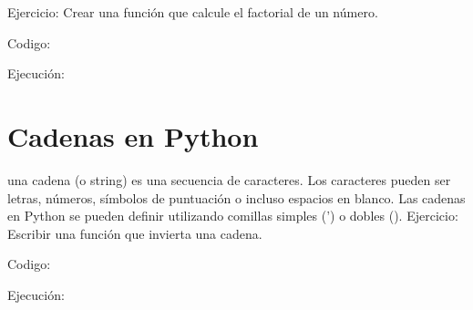 \documentclass[a4paper]{article}
\begin{document}
\bigskip

{
Ejercicio: Crear una función que calcule el factorial de un número.}



\begin{center}
\end{center}
{
Codigo:}

{
Ejecución:}

\begin{center}
\end{center}

\bigskip

\section{Cadenas en Python}

\bigskip

{
una cadena (o string) es una secuencia de caracteres. Los caracteres pueden ser letras, números, símbolos de puntuación
o incluso espacios en blanco. Las cadenas en Python se pueden definir utilizando comillas simples (') o dobles
({\textquotedbl}).}
\clearpage
\pagestyle{Convertedi}
{
Ejercicio: Escribir una función que invierta una cadena.}

\begin{center}
\end{center}

\bigskip

{
Codigo:}

{
Ejecución:}

\begin{center}
\end{center}

\bigskip
\end{document}

